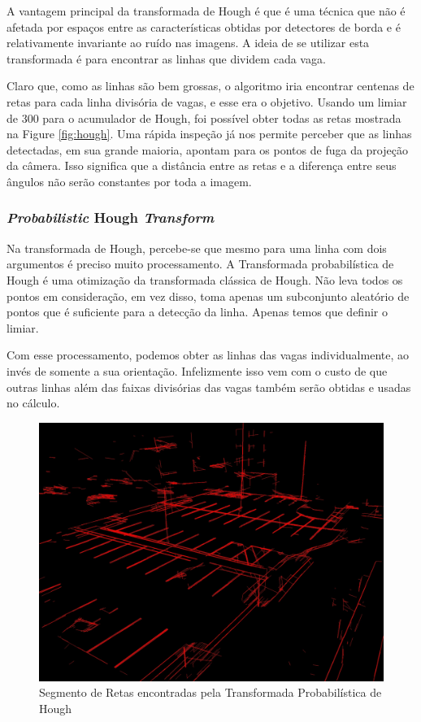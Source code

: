 \documentclass[10pt,twocolumn,letterpaper]{article}
\begin{document}
	A vantagem principal da transformada de Hough é que é uma técnica que não é afetada
por espaços entre as características obtidas por detectores de borda e é relativamente invariante
ao ruído nas imagens. A ideia de se utilizar esta transformada é para encontrar as linhas que dividem
cada vaga.

	Claro que, como as linhas são bem grossas, o algoritmo iria encontrar centenas
de retas para cada linha divisória de vagas, e esse era o objetivo. Usando um limiar de
300 para o acumulador de Hough, foi possível obter todas as retas mostrada na Figure
\ref{fig:hough}. Uma rápida inspeção já nos permite perceber que as linhas detectadas,
em sua grande maioria, apontam para os pontos de fuga da projeção da câmera.
Isso significa que a distância entre as retas e a diferença entre seus ângulos não serão constantes
por toda a imagem.

\subsubsection{{\em Probabilistic} Hough {\em Transform}}

	Na transformada de Hough, percebe-se que mesmo para uma linha com dois argumentos
é preciso muito processamento. A Transformada probabilística de Hough{\footnotesize \cite{probabilistic-hough}}
é uma otimização da transformada clássica de Hough. Não leva todos os pontos em consideração,
em vez disso, toma apenas um subconjunto aleatório de pontos que é suficiente para a detecção
da linha. Apenas temos que definir o limiar.

	Com esse processamento, podemos obter as linhas das vagas individualmente, ao invés de
somente a sua orientação. Infelizmente isso vem com o custo de que outras linhas além das faixas
divisórias das vagas também serão obtidas e usadas no cálculo.


\begin{figure}[!htb]
\centering
\includegraphics[scale=0.15]{hough-segmentolinhas.jpg}
\caption{Segmento de Retas encontradas pela Transformada Probabilística de Hough}
\label{Rotulo}
\end{figure}
\end{document}
